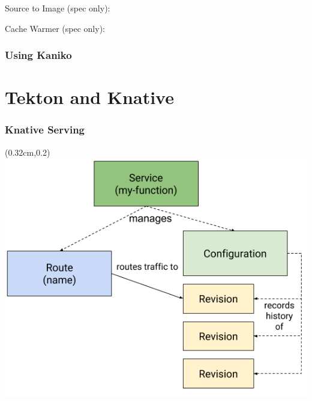 \documentclass[aspectratio=169,11pt,hyperref={colorlinks=true}]{beamer}
\begin{document}
\begin{lblackrwhiteframe}
\begin{blackframe}
\begin{2columnsframe}
  {
  {\tiny Source to Image (spec only): \\}
  
  }
  {
  
  {\tiny Cache Warmer (spec only): \\}
  
  }
  \frametitle{Using Kaniko}
\end{2columnsframe}

\section{Tekton and Knative}

\begin{tblackbgrayframe}
  \frametitle{Knative Serving}
  \begin{textblock*}{\paperwidth}(0.32cm,0.2\paperheight)
    \centering
    \includegraphics[width=0.5\paperwidth]{img/knative-serving.png}
  \end{textblock*}
\end{tblackbgrayframe}


\end{blackframe}
\end{lblackrwhiteframe}
\end{document}
